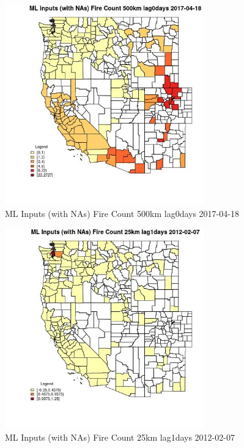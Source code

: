 \begin{figure} 
\centering  
\includegraphics[width=0.77\textwidth]{Code_Outputs/Report_ML_input_PM25_Step4_part_f_de_duplicated_aves_prioritize_24hr_obswNAs_CountyFire_Count_500km_lag0daysMean2017-04-18.jpg} 
\caption{\label{fig:Report_ML_input_PM25_Step4_part_f_de_duplicated_aves_prioritize_24hr_obswNAsCountyFire_Count_500km_lag0daysMean2017-04-18}ML Inputs (with NAs) Fire Count 500km lag0days 2017-04-18} 
\end{figure} 
 

\begin{figure} 
\centering  
\includegraphics[width=0.77\textwidth]{Code_Outputs/Report_ML_input_PM25_Step4_part_f_de_duplicated_aves_prioritize_24hr_obswNAs_CountyFire_Count_25km_lag1daysMean2012-02-07.jpg} 
\caption{\label{fig:Report_ML_input_PM25_Step4_part_f_de_duplicated_aves_prioritize_24hr_obswNAsCountyFire_Count_25km_lag1daysMean2012-02-07}ML Inputs (with NAs) Fire Count 25km lag1days 2012-02-07} 
\end{figure} 
 

